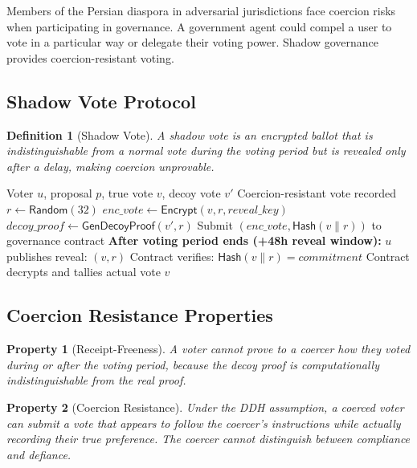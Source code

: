 \documentclass[11pt,a4paper]{article}
\newtheorem{definition}{Definition}
\newtheorem{property}{Property}
\begin{document}
Members of the Persian diaspora in adversarial jurisdictions face coercion risks when participating in governance. A government agent could compel a user to vote in a particular way or delegate their voting power. Shadow governance provides coercion-resistant voting.

\subsection{Shadow Vote Protocol}

\begin{definition}[Shadow Vote]
A shadow vote is an encrypted ballot that is indistinguishable from a normal vote during the voting period but is revealed only after a delay, making coercion unprovable.
\end{definition}

\begin{algorithm}[H]
\caption{Shadow Vote Casting}
\label{alg:shadow}
\begin{algorithmic}[1]
\Require Voter $u$, proposal $p$, true vote $v$, decoy vote $v'$
\Ensure Coercion-resistant vote recorded
\State $r \leftarrow \mathsf{Random}(32)$ 
\State $\mathit{enc\_vote} \leftarrow \mathsf{Encrypt}(v, r, \mathit{reveal\_key})$
\State $\mathit{decoy\_proof} \leftarrow \mathsf{GenDecoyProof}(v', r)$ 
\State Submit $(\mathit{enc\_vote}, \mathsf{Hash}(v \| r))$ to governance contract
\Statex \textbf{After voting period ends (+48h reveal window):}
\State $u$ publishes reveal: $(v, r)$
\State Contract verifies: $\mathsf{Hash}(v \| r) = \mathit{commitment}$
\State Contract decrypts and tallies actual vote $v$
\end{algorithmic}
\end{algorithm}

\subsection{Coercion Resistance Properties}

\begin{property}[Receipt-Freeness]
A voter cannot prove to a coercer how they voted during or after the voting period, because the decoy proof is computationally indistinguishable from the real proof.
\end{property}

\begin{property}[Coercion Resistance]
Under the DDH assumption, a coerced voter can submit a vote that appears to follow the coercer's instructions while actually recording their true preference. The coercer cannot distinguish between compliance and defiance.
\end{property}
\end{document}
